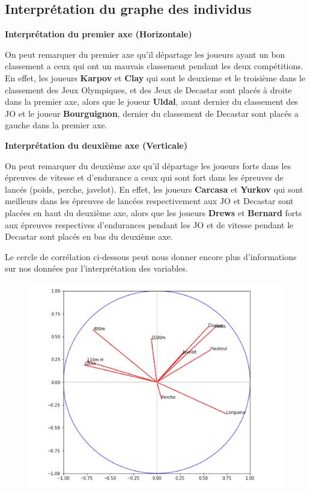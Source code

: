 \documentclass{article}
\begin{document}
\subsection{Interprétation du graphe des individus}

\begin{flushleft}
\textbf{Interprétation du premier axe (Horizontale)}
\end{flushleft}

On peut remarquer du premier axe qu'il départage les joueurs ayant un bon classement a ceux qui ont un mauvais classement pendant les deux compétitions.
En effet, les joueurs \textbf{Karpov} et \textbf{Clay} qui sont le deuxieme et le troisième dans le classement des Jeux Olympiques, et des Jeux de Decastar sont placés à droite dans la premier axe, alors que le joueur \textbf{Uldal}, avant dernier du classement des JO et le joueur \textbf{Bourguignon}, dernier du classement de Decastar sont placés a gauche dans la premier axe. 

\begin{flushleft}
\textbf{Interprétation du deuxième axe (Verticale)}
\end{flushleft}

On peut remarquer du deuxième axe qu'il départage les joueurs forts dans les épreuves de vitesse et d'endurance a ceux qui sont fort dans les épreuves de lancés (poids, perche, javelot).
En effet, les joueurs \textbf{Carcasa} et \textbf{Yurkov} qui sont meilleurs dans les épreuves de lancées respectivement aux JO et Decastar sont placées en haut du deuxième axe, alors que les joueurs \textbf{Drews} et \textbf{Bernard} forts aux épreuves respectives d'endurances pendant les JO et de vitesse pendant le Decastar sont placés en bas du deuxième axe.

\newpage

Le cercle de corrélation ci-dessous peut nous donner encore plus d'informations sur nos données par l'interprétation des variables.

\begin{figure}[h!]
\includegraphics[width=\linewidth]{images/cercle_cor.png}
\end{figure}
\end{document}
